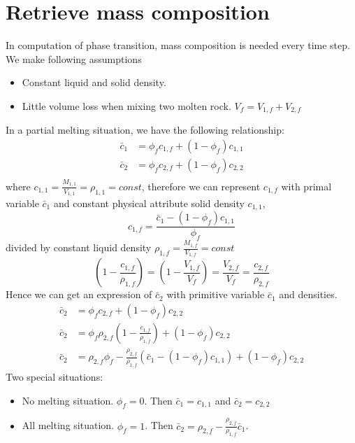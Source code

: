 \section{Retrieve mass composition}

In computation of phase transition, mass composition is needed every time step.
We make following assumptions
\begin{itemize}
\item Constant liquid and solid density.
\item Little volume loss when mixing two molten rock. $V_f = V_{1,f} + V_{2,f}$
\end{itemize}
In a partial melting situation, we have the following relationship:
\begin{equation}
\begin{aligned}
\bar{c}_1 &= \phi_f c_{1,f} + (1-\phi_f) c_{1,1} \\
\bar{c}_2 &= \phi_f c_{2,f} + (1-\phi_f) c_{2,2} \\
\end{aligned}
\end{equation}
where $c_{1,1} = \frac{M_{1,1}}{V_{1,1}} = \rho_{1,1} = const $, therefore we 
can represent $c_{1,f}$ with primal variable $\bar{c}_1$ and constant physical attribute
solid density $c_{1,1}$,
$$c_{1,f} = \frac{\bar{c}_1 - (1-\phi_f)c_{1,1}}{\phi_f}$$
divided by constant liquid density $\rho_{1,f} = \frac{M_{1,f}}{V_{1,f}} = const$
$$(1-\frac{c_{1,f}}{\rho_{1,f}}) = (1-\frac{V_{1,f}}{V_f}) = \frac{V_{2,f}}{V_f} = \frac{c_{2,f}}{\rho_{2,f}} $$
Hence we can get an expression of $\bar{c}_2$ with primitive variable $\bar{c}_1$ and densities.
\begin{equation}
\begin{aligned}
		  \bar{c}_2 &= \phi_f c_{2,f} + (1-\phi_f) c_{2,2} \\
		  \bar{c}_2 &= \phi_f \rho_{2,f}(1-\frac{c_{1,f}}{\rho_{1,f}}) + (1-\phi_f)c_{2,2}\\
		  \bar{c}_2 &= \rho_{2,f}\phi_f - \frac{\rho_{2,f}}{\rho_{1,f}}(\bar{c}_1 - (1-\phi_f)c_{1,1}) + (1-\phi_f)c_{2,2}
\end{aligned}
\end{equation}
Two special situations:
\begin{itemize}
\item No melting situation. $\phi_f = 0$. Then $\bar{c}_1 = c_{1,1}$ and $\bar{c}_2 = c_{2,2}$
\item All melting situation. $\phi_f = 1$. Then $\bar{c}_2 = \rho_{2,f} - \frac{\rho_{2,f}}{\rho_{1,f}}\bar{c}_1 $.
\end{itemize}
